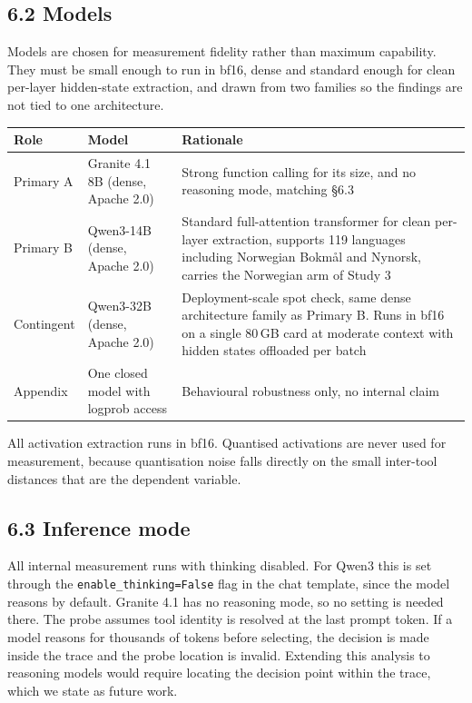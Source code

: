 \documentclass[11pt,a4paper]{article}
\begin{document}
\subsection*{6.2 Models}

Models are chosen for measurement fidelity rather than maximum capability. They must be small
enough to run in bf16, dense and standard enough for clean per-layer hidden-state extraction, and
drawn from two families so the findings are not tied to one architecture.

\begin{tabular}{@{}L{1.9cm}L{4.3cm}L{9.2cm}@{}}
\toprule
\textbf{Role} & \textbf{Model} & \textbf{Rationale} \\
\midrule
Primary A & Granite 4.1 8B (dense, Apache 2.0) & Strong function calling for its size, and no reasoning mode, matching \S6.3 \\
Primary B & Qwen3-14B (dense, Apache 2.0) & Standard full-attention transformer for clean per-layer extraction, supports 119 languages including Norwegian Bokm{\aa}l and Nynorsk, carries the Norwegian arm of Study 3 \\
Contingent & Qwen3-32B (dense, Apache 2.0) & Deployment-scale spot check, same dense architecture family as Primary B. Runs in bf16 on a single 80\,GB card at moderate context with hidden states offloaded per batch \\
Appendix & One closed model with logprob access & Behavioural robustness only, no internal claim \\
\bottomrule
\end{tabular}

All activation extraction runs in bf16. Quantised activations are never used for measurement,
because quantisation noise falls directly on the small inter-tool distances that are the
dependent variable.

\subsection*{6.3 Inference mode}

All internal measurement runs with thinking disabled. For Qwen3 this is set through the
\texttt{enable\_thinking=False} flag in the chat template, since the model reasons by default.
Granite 4.1 has no reasoning mode, so no setting is needed there. The probe assumes tool identity
is resolved at the last prompt token. If a model reasons for thousands of tokens before
selecting, the decision is made inside the trace and the probe location is invalid. Extending
this analysis to reasoning models would require locating the decision point within the trace,
which we state as future work.
\end{document}
